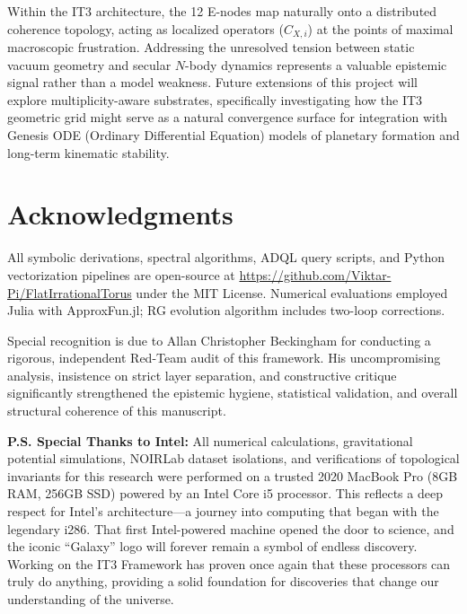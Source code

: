 \documentclass[11pt,a4paper]{article}
\theoremstyle{remark}
\begin{document}
Within the IT3 architecture, the 12 E-nodes map naturally onto a distributed coherence topology, acting as localized operators ($C_{X,i}$) at the points of maximal macroscopic frustration. Addressing the unresolved tension between static vacuum geometry and secular $N$-body dynamics represents a valuable epistemic signal rather than a model weakness. Future extensions of this project will explore multiplicity-aware substrates, specifically investigating how the IT3 geometric grid might serve as a natural convergence surface for integration with Genesis ODE (Ordinary Differential Equation) models of planetary formation and long-term kinematic stability.

\section*{Acknowledgments}

All symbolic derivations, spectral algorithms, ADQL query scripts, and Python vectorization pipelines are open-source at \url{https://github.com/Viktar-Pi/FlatIrrationalTorus} under the MIT License. Numerical evaluations employed Julia with ApproxFun.jl; RG evolution algorithm includes two-loop corrections. 

Special recognition is due to Allan Christopher Beckingham for conducting a rigorous, independent Red-Team audit of this framework. His uncompromising analysis, insistence on strict layer separation, and constructive critique significantly strengthened the epistemic hygiene, statistical validation, and overall structural coherence of this manuscript.

\textbf{P.S. Special Thanks to Intel:}
All numerical calculations, gravitational potential simulations, NOIRLab dataset isolations, and verifications of topological invariants for this research were performed on a trusted 2020 MacBook Pro (8GB RAM, 256GB SSD) powered by an Intel Core i5 processor. This reflects a deep respect for Intel's architecture---a journey into computing that began with the legendary i286. That first Intel-powered machine opened the door to science, and the iconic ``Galaxy'' logo will forever remain a symbol of endless discovery. Working on the IT3 Framework has proven once again that these processors can truly do anything, providing a solid foundation for discoveries that change our understanding of the universe.
\end{document}
